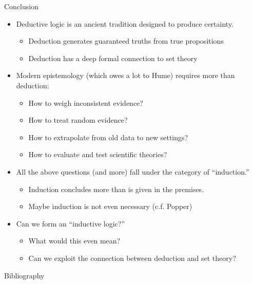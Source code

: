 \documentclass[8pt]{beamer}\usepackage[]{graphicx}\usepackage[]{color}
\begin{document}

\begin{frame}{Conclusion}
%
\begin{itemize}
%
\item Deductive logic is an ancient tradition designed to produce certainty.
%
    \begin{itemize}
    \item Deduction generates guaranteed truths from true propositions
    \item Deduction has a deep formal connection to set theory
    \end{itemize}
%
\item Modern epistemology (which owes a lot to Hume) requires more than deduction:
%
    \begin{itemize}
    \item How to weigh inconsistent evidence?
    \item How to treat random evidence?
    \item How to extrapolate from old data to new settings?
    \item How to evaluate and test scientific theories?
    \end{itemize}
%
\item All the above questions (and more) fall under the category of ``induction.''
%
    \begin{itemize}
    \item Induction concludes more than is given in the premises.
    \item Maybe induction is not even necessary (c.f. Popper)
    \end{itemize}
%
\item Can we form an ``inductive logic?''
    \begin{itemize}
        \item What would this even mean?
        \item Can we exploit the connection between deduction and set theory?
    \end{itemize}
%
\end{itemize}
%
\end{frame}


\begin{frame}{Bibliography}
\printbibliography{}
\end{frame}
\end{document}

